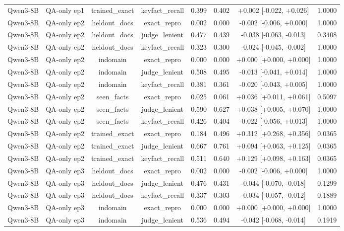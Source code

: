 \begin{table}[t]
{\begin{tabular}{llcccccc}
Qwen3-8B & QA-only ep1 & trained\_exact & keyfact\_recall & 0.399 & 0.402 & +0.002 [-0.022, +0.026] & 1.0000 \\
Qwen3-8B & QA-only ep2 & heldout\_docs & exact\_repro & 0.002 & 0.000 & -0.002 [-0.006, +0.000] & 1.0000 \\
Qwen3-8B & QA-only ep2 & heldout\_docs & judge\_lenient & 0.477 & 0.439 & -0.038 [-0.063, -0.013] & 0.3408 \\
Qwen3-8B & QA-only ep2 & heldout\_docs & keyfact\_recall & 0.323 & 0.300 & -0.024 [-0.045, -0.002] & 1.0000 \\
Qwen3-8B & QA-only ep2 & indomain & exact\_repro & 0.000 & 0.000 & +0.000 [+0.000, +0.000] & 1.0000 \\
Qwen3-8B & QA-only ep2 & indomain & judge\_lenient & 0.508 & 0.495 & -0.013 [-0.041, +0.014] & 1.0000 \\
Qwen3-8B & QA-only ep2 & indomain & keyfact\_recall & 0.381 & 0.361 & -0.020 [-0.043, +0.005] & 1.0000 \\
Qwen3-8B & QA-only ep2 & seen\_facts & exact\_repro & 0.025 & 0.061 & +0.036 [+0.011, +0.061] & 0.5097 \\
Qwen3-8B & QA-only ep2 & seen\_facts & judge\_lenient & 0.590 & 0.627 & +0.038 [+0.005, +0.070] & 1.0000 \\
Qwen3-8B & QA-only ep2 & seen\_facts & keyfact\_recall & 0.426 & 0.404 & -0.022 [-0.056, +0.013] & 1.0000 \\
Qwen3-8B & QA-only ep2 & trained\_exact & exact\_repro & 0.184 & 0.496 & +0.312 [+0.268, +0.356] & 0.0365 \\
Qwen3-8B & QA-only ep2 & trained\_exact & judge\_lenient & 0.667 & 0.761 & +0.094 [+0.063, +0.125] & 0.0365 \\
Qwen3-8B & QA-only ep2 & trained\_exact & keyfact\_recall & 0.511 & 0.640 & +0.129 [+0.098, +0.163] & 0.0365 \\
Qwen3-8B & QA-only ep3 & heldout\_docs & exact\_repro & 0.002 & 0.000 & -0.002 [-0.006, +0.000] & 1.0000 \\
Qwen3-8B & QA-only ep3 & heldout\_docs & judge\_lenient & 0.476 & 0.431 & -0.044 [-0.070, -0.018] & 0.1299 \\
Qwen3-8B & QA-only ep3 & heldout\_docs & keyfact\_recall & 0.337 & 0.303 & -0.034 [-0.057, -0.012] & 0.1889 \\
Qwen3-8B & QA-only ep3 & indomain & exact\_repro & 0.000 & 0.000 & +0.000 [+0.000, +0.000] & 1.0000 \\
Qwen3-8B & QA-only ep3 & indomain & judge\_lenient & 0.536 & 0.494 & -0.042 [-0.068, -0.014] & 0.1919 \\

\end{tabular}}
\end{table}
